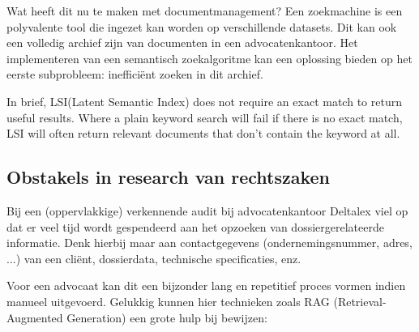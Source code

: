 Wat heeft dit nu te maken met documentmanagement? Een zoekmachine is een polyvalente tool die ingezet kan worden op verschillende datasets. Dit kan ook een volledig archief zijn van 
documenten in een advocatenkantoor. Het implementeren van een semantisch zoekalgoritme kan een oplossing bieden op het eerste subprobleem: inefficiënt zoeken in dit archief. 

\begin{displayquote}
	In brief, LSI(Latent Semantic Index) does not require an exact match to return useful results. 
	Where a plain keyword search will fail if there is no exact match, 
	LSI will often return relevant documents that don’t contain the keyword at all. \autocite{Medium}
\end{displayquote}

\subsection{Obstakels in research van rechtszaken}
Bij een (oppervlakkige) verkennende audit bij advocatenkantoor Deltalex viel op dat er veel tijd wordt gespendeerd aan het opzoeken van dossiergerelateerde informatie. Denk hierbij maar aan
contactgegevens (ondernemingsnummer, adres, ...) van een cliënt, dossierdata, technische specificaties, enz. 

Voor een advocaat kan dit een bijzonder lang en repetitief proces vormen indien manueel uitgevoerd. Gelukkig kunnen hier technieken zoals RAG (Retrieval-Augmented Generation) een grote hulp
bij bewijzen:


